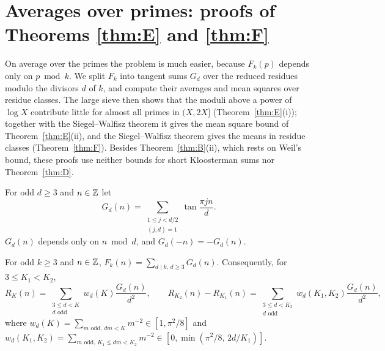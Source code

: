 %
\makeatletter
\newenvironment{leancode}{%
  \trivlist\item\relax
  \leftskip\@totalleftmargin\rightskip\z@skip
  \parindent\z@\parfillskip\@flushglue\parskip\z@skip
  \@@par
  \@tempswafalse
  \def\par{%
    \if@tempswa
      \leavevmode\null\@@par\penalty\interlinepenalty
    \else
      \@tempswatrue
      \ifhmode\@@par\penalty\interlinepenalty\fi
    \fi}%
  \ttfamily\frenchspacing\@noligs
  \catcode`\_=12 \catcode`\^=12
  \obeylines\@vobeyspaces}{\endtrivlist}
\makeatother

\section{Averages over primes: proofs of Theorems \texorpdfstring{\ref{thm:E}}{E} and \texorpdfstring{\ref{thm:F}}{F}}\label{sec:averages}

On average over the primes the problem is much easier, because $F_k(p)$ depends only on $p\bmod k$. We split $F_k$ into tangent sums $G_d$ over the reduced residues modulo the divisors $d$ of $k$, and compute their averages and mean squares over residue classes. The large sieve then shows that the moduli above a power of $\log X$ contribute little for almost all primes in $(X,2X]$ (Theorem~\ref{thm:E}(i)); together with the Siegel--Walfisz theorem it gives the mean square bound of Theorem~\ref{thm:E}(ii), and the Siegel--Walfisz theorem gives the means in residue classes (Theorem~\ref{thm:F}). Besides Theorem~\ref{thm:B}(ii), which rests on Weil's bound, these proofs use neither bounds for short Kloosterman sums nor Theorem~\ref{thm:D}.

For odd $d\ge 3$ and $n\in\mathbb{Z}$ let
\[
G_d(n)=\sum_{\substack{1\le j<d/2\\ (j,d)=1}}\tan\frac{\pi jn}{d}.
\]
$G_d(n)$ depends only on $n\bmod d$, and $G_d(-n)=-G_d(n)$.

\begin{lemma}\label{lem:Gd-decomposition}
For odd $k\ge 3$ and $n\in\mathbb{Z}$, $F_k(n)=\sum_{d\mid k,\,d\ge 3}G_d(n)$. Consequently, for $3\le K_1<K_2$,
\[
R_K(n)=\sum_{\substack{3\le d<K\\ d\text{ odd}}}w_d(K)\frac{G_d(n)}{d^2},\qquad
R_{K_2}(n)-R_{K_1}(n)=\sum_{\substack{3\le d<K_2\\ d\text{ odd}}}w_d(K_1,K_2)\frac{G_d(n)}{d^2},
\]
where $w_d(K)=\sum_{m\text{ odd},\,dm<K}m^{-2}\in[1,\pi^2/8]$ and $w_d(K_1,K_2)=\sum_{m\text{ odd},\,K_1\le dm<K_2}m^{-2}\in[0,\min(\pi^2/8,\,2d/K_1)]$.
\end{lemma}

